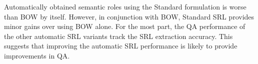 Automatically obtained semantic roles using the Standard formulation is worse than BOW by itself. 
However, in conjunction with BOW, Standard SRL provides minor gains over using BOW alone. 
For the most part, the QA performance of the other automatic SRL variants track the SRL extraction accuracy. 
This suggests that improving the automatic SRL performance is likely to provide improvements in QA. 

